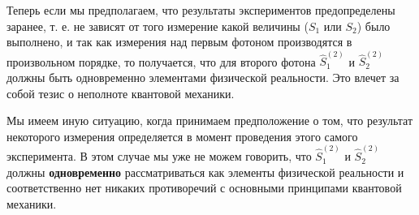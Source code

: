 Теперь если мы предполагаем, что результаты экспериментов
предопределены заранее, т. е. не зависят от того измерение какой
величины ($S_1$ или $S_2$) было выполнено, и так как измерения над
первым фотоном производятся в произвольном порядке, то
получается, что для второго фотона $\hat{S}^{(2)}_1$ и
$\hat{S}^{(2)}_2$ должны быть одновременно элементами физической
реальности. Это влечет за собой тезис о неполноте квантовой механики.

Мы имеем иную ситуацию, когда принимаем предположение о том, что
результат некоторого измерения определяется в момент проведения этого
самого эксперимента. В этом случае мы уже не можем говорить, что 
$\hat{S}_1^{(2)}$ и $\hat{S}_2^{(2)}$ должны {\bf одновременно}
рассматриваться как элементы физической реальности и соответственно нет
никаких противоречий с основными принципами квантовой механики.





